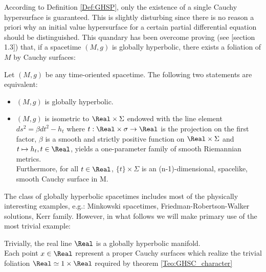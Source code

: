 \documentclass[Main]{subfiles}
\begin{document}
			According to Definition \ref{Def:GHSP}, only the existence of a single Cauchy hypersurface is guaranteed. 
			This is slightly disturbing since there is no reason a priori why an initial value hypersurface for a certain partial differential equation should be distinguished. 
			This quandary has been overcome proving (see \cite{Baer2008}[section 1.3]) that, if a spacetime $(M,g)$ is globally hyperbolic, there exists a foliation of $M$ by Cauchy surfaces:
			\begin{theorem}\label{Teo:GHSC_character}
				Let $(M,g)$ be any time-oriented spacetime. The following two statements are equivalent:
				\begin{itemize}
					\item $(M,g)$ is globally hyperbolic.
					\item $(M,g)$ is isometric to $ \Real \times \Sigma $ 
						endowed with the line element $ds^2 = \beta dt^2 - h_t$ 
						where $t : \Real \times \sigma \rightarrow \Real$ is the projection on the first factor, 
						$\beta$ is a smooth and strictly positive function on $\Real \times \Sigma$ 
						and $t \mapsto h_t , t \in \Real$, yields a one-parameter family of smooth Riemannian metrics.\\
						Furthermore, for all $t\in \Real$, $\{t\}\times \Sigma$ is an (n-1)-dimensional, spacelike, smooth Cauchy surface in M.
				\end{itemize}
			\end{theorem}
			
			The class of globally hyperbolic spacetimes includes most of the physically interesting examples, e.g.: Minkowski spacetimes, Friedman-Robertson-Walker solutions, Kerr family. 
			However, in what follows we will make primary use of the most trivial example:
			\begin{example}
				Trivially, the real line $\Real$ is a globally hyperbolic manifold.
				\\
				Each point $x\in \Real$ represent a proper Cauchy surfaces which realize the trivial foliation $\Real \simeq 1\times \Real $ required by theorem \ref{Teo:GHSC_character}
			\end{example}
\end{document}
